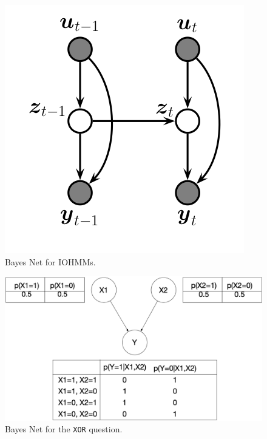 \documentclass{article}
\begin{document}
\begin{figure}
\centering
\includegraphics[height=0.3\textheight]{LDS-UZY}
\caption{Bayes Net for IOHMMs.}
\label{fig:iohmm-bn}
\end{figure}
\begin{figure}
\centering
\includegraphics[height=0.3\textheight]{ml-hw3-bayes}
\caption{Bayes Net for the \texttt{XOR} question.}
\label{fig:hw3-bn}
\end{figure}
\end{document}
